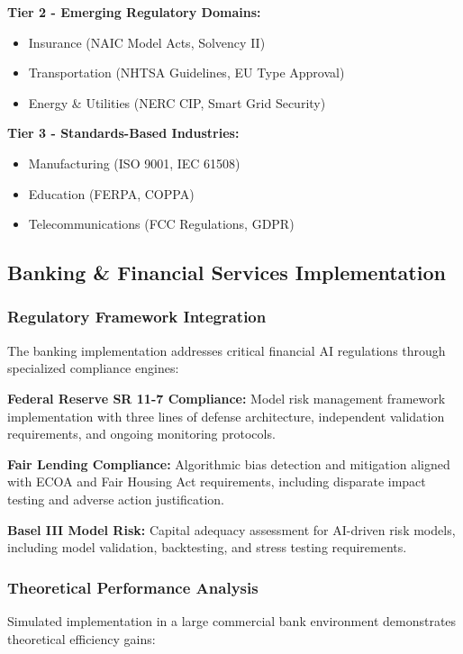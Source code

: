 \documentclass[12pt,a4paper]{article}
\begin{document}
\textbf{Tier 2 - Emerging Regulatory Domains:}
\begin{itemize}
\item Insurance (NAIC Model Acts, Solvency II)
\item Transportation (NHTSA Guidelines, EU Type Approval)
\item Energy \& Utilities (NERC CIP, Smart Grid Security)
\end{itemize}

\textbf{Tier 3 - Standards-Based Industries:}
\begin{itemize}
\item Manufacturing (ISO 9001, IEC 61508)
\item Education (FERPA, COPPA)
\item Telecommunications (FCC Regulations, GDPR)
\end{itemize}

\subsection{Banking \& Financial Services Implementation}

\subsubsection{Regulatory Framework Integration}

The banking implementation addresses critical financial AI regulations through specialized compliance engines:

\textbf{Federal Reserve SR 11-7 Compliance:} Model risk management framework implementation with three lines of defense architecture, independent validation requirements, and ongoing monitoring protocols.

\textbf{Fair Lending Compliance:} Algorithmic bias detection and mitigation aligned with ECOA and Fair Housing Act requirements, including disparate impact testing and adverse action justification.

\textbf{Basel III Model Risk:} Capital adequacy assessment for AI-driven risk models, including model validation, backtesting, and stress testing requirements.

\subsubsection{Theoretical Performance Analysis}

Simulated implementation in a large commercial bank environment demonstrates theoretical efficiency gains:
\end{document}
